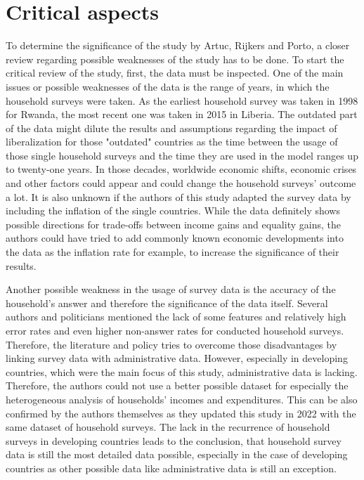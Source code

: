 \chapter{Critical aspects}

To determine the significance of the study by Artuc, Rijkers and Porto, a closer review regarding possible weaknesses of the
study has to be done. 
To start the critical review of the study, first, the data must be inspected. One of the main issues or possible weaknesses
of the data is the range of years, in which the household surveys were taken. As the earliest household survey was taken in 
1998 for Rwanda, the most recent one was taken in 2015 in Liberia. The outdated part of the data might dilute the results and
assumptions regarding the impact of liberalization for those "outdated" countries as the time between the usage of those
single household surveys and the time they are used in the model ranges up to twenty-one years. In those decades, worldwide
economic shifts, economic crises and other factors could appear and could change the household surveys' outcome a lot. It is
also unknown if the authors of this study adapted the survey data by including the inflation of the single countries. 
While the data definitely shows possible directions for trade-offs between income gains and equality gains, the authors could
have tried to add commonly known economic developments into the data as the inflation rate for example, to increase the 
significance of their results.

Another possible weakness in the usage of survey data is the accuracy of the household's answer and therefore the significance 
of the data itself. Several authors and politicians mentioned the lack of some features and relatively high error rates and 
even higher non-answer rates for conducted household surveys. Therefore, the literature and policy tries to overcome those
disadvantages by linking survey data with administrative data. However, especially in developing countries, which were the
main focus of this study, administrative data is lacking. Therefore, the authors could not use a better possible dataset for
especially the heterogeneous analysis of households' incomes and expenditures. This can be also confirmed by the authors themselves
as they updated this study in 2022 with the same dataset of household surveys. The lack in the recurrence of household surveys
in developing countries leads to the conclusion, that household survey data is still the most detailed data possible, especially
in the case of developing countries as other possible data like administrative data is still an exception.

